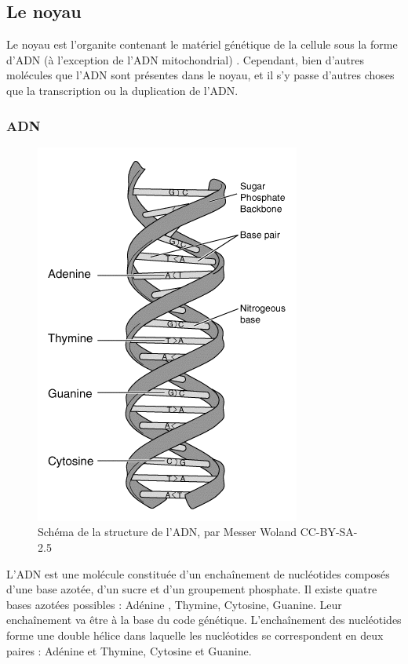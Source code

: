 \subsection{Le noyau}

Le noyau est l'organite contenant le matériel génétique de la cellule sous la forme d'ADN (à l'exception de l'ADN mitochondrial) . Cependant, bien d'autres molécules que l'ADN sont présentes dans le noyau, et il s'y passe d'autres choses que la transcription ou la duplication de l'ADN. 

\subsubsection{ADN}

\begin{figure}
\includegraphics[scale=0.3]{ADN.png}
\caption{Schéma de la structure de l'ADN, par Messer Woland CC-BY-SA-2.5}
\end{figure}

L'ADN est une molécule constituée d'un enchaînement de nucléotides composés d'une base azotée, d'un sucre et d'un groupement phosphate. Il existe quatre bases azotées possibles : Adénine , Thymine, Cytosine, Guanine. Leur enchaînement va être à la base du code génétique.
L'enchaînement des nucléotides forme une double hélice dans laquelle les nucléotides se correspondent en deux paires : Adénine et Thymine, Cytosine et Guanine. 

